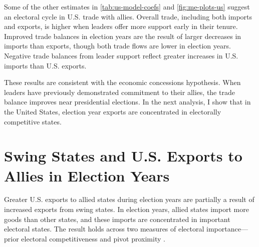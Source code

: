 \documentclass[12pt]{article}
\begin{document}
Some of the other estimates in \autoref{tab:us-model-coefs} and \autoref{fig:me-plots-us} suggest an electoral cycle in U.S. trade with allies.
Overall trade, including both imports and exports, is higher when leaders offer more support early in their tenure.
Improved trade balances in election years are the result of larger decreases in imports than exports, though both trade flows are lower in election years.
Negative trade balances from leader support reflect greater increases in U.S. imports than U.S. exports. 


These results are consistent with the economic concessions hypothesis. 
When leaders have previously demonstrated commitment to their allies, the trade balance improves near presidential elections.
In the next analysis, I show that in the United States, election year exports are concentrated in electorally competitive states.



\section{Swing States and U.S. Exports to Allies in Election Years}


Greater U.S. exports to allied states during election years are partially a result of increased exports from swing states.
In election years, allied states import more goods than other states, and these imports are concentrated in important electoral states.
The result holds across two measures of electoral importance--- prior electoral competitiveness and pivot proximity \citep{Wright2009}.
\end{document}
